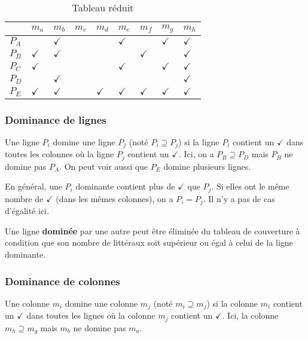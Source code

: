 \documentclass[11pt]{article}
\begin{document}
\begin{table}[htbp]
\caption{\label{tab:orgeeff7da}Tableau réduit}
\centering
\begin{tabular}{lllllllll}
 & \(m_a\) & \(m_b\) & \(m_c\) & \(m_d\) & \(m_e\) & \(m_f\) & \(m_g\) & \(m_h\)\\
\hline
\(P_A\) &  & \(\checkmark\) &  &  & \(\checkmark\) &  & \(\checkmark\) & \(\checkmark\)\\
\(P_B\) & \(\checkmark\) & \(\checkmark\) &  &  &  & \(\checkmark\) &  & \(\checkmark\)\\
\(P_C\) & \(\checkmark\) &  &  &  & \(\checkmark\) &  & \(\checkmark\) & \(\checkmark\)\\
\(P_D\) &  & \(\checkmark\) &  &  &  &  &  & \(\checkmark\)\\
\(P_E\) & \(\checkmark\) & \(\checkmark\) &  & \(\checkmark\) & \(\checkmark\) & \(\checkmark\) & \(\checkmark\) & \(\checkmark\)\\
\end{tabular}
\end{table}


\subsubsection{Dominance de lignes}
\label{sec:org6b2ea5e}

Une ligne \(P_i\) domine une ligne \(P_j\) (noté \(P_i \supseteq
P_j\)) si la ligne \(P_i\) contient un \(\checkmark\) dans toutes les colonnes où
la ligne \(P_j\) contient un \(\checkmark\). Ici, on a \(P_B \supseteq P_D\) mais
\(P_B\) ne domine pas \(P_A\). On peut voir aussi que \(P_E\) domine
plusieurs lignes.

En général, une \(P_i\) dominante contient plus de \(\checkmark\) que \(P_j\). Si
elles ont le même nombre de \(\checkmark\) (dans les mêmes colonnes), on a \(P_i =
P_j\). Il n'y a pas de cas d'égalité ici.

Une ligne \textbf{dominée} par une autre peut être éliminée du tableau de
couverture à condition que son nombre de littéraux soit supérieur ou
égal à celui de la ligne dominante.

\subsubsection{Dominance de colonnes}
\label{sec:org8e06a30}

Une colonne \(m_i\) domine une colonne \(m_j\) (noté \(m_i \supseteq
m_j\)) si la colonne \(m_i\) contient un \(\checkmark\) dans toutes les lignes où
la colonne \(m_j\) contient un \(\checkmark\). Ici, la colonne \(m_h \supseteq
m_g\) mais \(m_b\) ne domine pas \(m_a\). 
\end{document}
